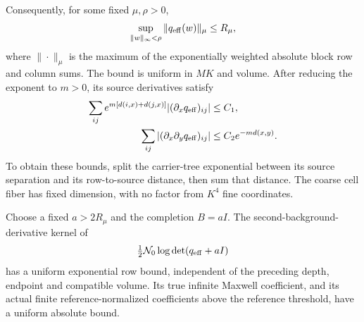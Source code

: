 Consequently, for some fixed $\mu,\rho>0$,
\begin{equation}
       \sup_{\|w\|_\infty<\rho}
                    \|q_{\rm eff}(w)\|_\mu\leq R_\mu,
 \label{dgb-coarse-Schur}
\end{equation}
where $\|\cdot\|_\mu$ is the maximum of the exponentially
weighted absolute block row and column sums.
The bound is uniform in $MK$ and volume. After reducing
the exponent to $m>0$, its source derivatives satisfy
\begin{align}
 \sum_{ij}e^{m[d(i,x)+d(j,x)]}
       |(\partial_xq_{\rm eff})_{ij}|&\leq C_1,\notag\\
 \sum_{ij}|(\partial_x\partial_yq_{\rm eff})_{ij}|
                              &\leq C_2e^{-md(x,y)}.
 \label{dgb-coarse-source-bounds}
\end{align}
To obtain these bounds, split the carrier-tree exponential
between its source separation and its row-to-source
distance, then sum that distance. The coarse cell fiber
has fixed dimension, with no factor from $K^4$ fine
coordinates.

\begin{proposition}
\label{dgb-coarse-proposition}
Choose a fixed $a>2R_\mu$ and the completion $B=aI$.
The second-background-derivative kernel of
\[
                \tfrac12\mathcal N_0
                        \log\det(q_{\rm eff}+aI)
\]
has a uniform exponential row bound, independent of the
preceding depth, endpoint and compatible volume.
Its true infinite Maxwell coefficient, and its actual
finite reference-normalized coefficients above the
reference threshold, have a uniform absolute bound.
\end{proposition}

